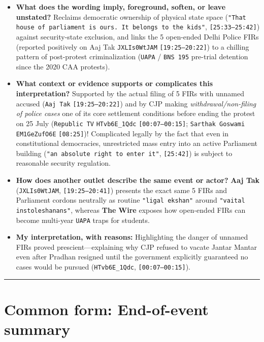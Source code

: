 \documentclass[10pt,a4paper]{article}
\begin{document}
\begin{itemize}[leftmargin=1.5em, itemsep=3pt, topsep=4pt]
  \item \textbf{What does the wording imply, foreground, soften, or leave unstated?} Reclaims democratic ownership of physical state space (\texttt{"That house of parliament is ours. It belongs to the kids"}, \texttt{[25:33--25:42]}) against security-state exclusion, and links the 5 open-ended Delhi Police FIRs (reported positively on Aaj Tak \texttt{JXLIs0WtJAM} \texttt{[19:25--20:22]}) to a chilling pattern of post-protest criminalization (\texttt{UAPA} / \texttt{BNS 195} pre-trial detention since the 2020 CAA protests).
  \item \textbf{What context or evidence supports or complicates this interpretation?} Supported by the actual filing of 5 FIRs with unnamed accused (\texttt{Aaj Tak} \texttt{[19:25--20:22]}) and by CJP making \textit{withdrawal/non-filing of police cases} one of its core settlement conditions before ending the protest on 25 July (\texttt{Republic TV} \texttt{HTvb6E\_1Qdc} \texttt{[00:07--00:15]}; \texttt{Sarthak Goswami} \texttt{EM1GeZufO6E} \texttt{[08:25]})! Complicated legally by the fact that even in constitutional democracies, unrestricted mass entry into an active Parliament building (\texttt{"an absolute right to enter it"}, \texttt{[25:42]}) is subject to reasonable security regulation.
  \item \textbf{How does another outlet describe the same event or actor?} \textbf{Aaj Tak} (\texttt{JXLIs0WtJAM}, \texttt{[19:25--20:41]}) presents the exact same 5 FIRs and Parliament cordons neutrally as routine \texttt{"ligal ekshan"} around \texttt{"vaital instoleshanans"}, whereas \textbf{The Wire} exposes how open-ended FIRs can become multi-year \texttt{UAPA} traps for students.
  \item \textbf{My interpretation, with reasons:} Highlighting the danger of unnamed FIRs proved prescient---explaining why CJP refused to vacate Jantar Mantar even after Pradhan resigned until the government explicitly guaranteed no cases would be pursued (\texttt{HTvb6E\_1Qdc}, \texttt{[00:07--00:15]}).
\end{itemize}
\vspace{4pt}\noindent\rule{\textwidth}{0.4pt}\vspace{4pt}

\section*{Common form: End-of-event summary}
\end{document}
